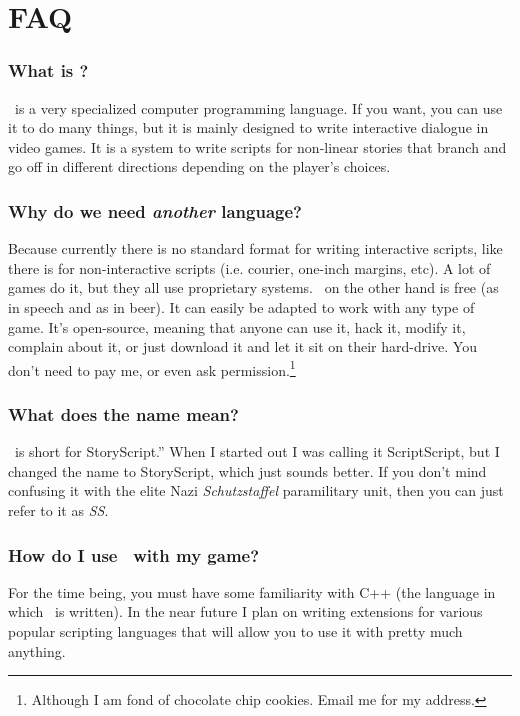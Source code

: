 \appendix

\chapter{FAQ}

\subsection{What is \SSquared?}
\SSquared\ is a very specialized computer programming language.  If you want, you can use it to do many things, but it is mainly designed to write interactive dialogue in video games.  It is a system to write scripts for non-linear stories that branch and go off in different directions depending on the player's choices.

\subsection{Why do we need \emph{another} language?}
Because currently there is no standard format for writing interactive scripts, like there is for non-interactive scripts (i.e. courier, one-inch margins, etc).  A lot of games do it, but they all use proprietary systems.  \SSquared\ on the other hand is free (as in speech and as in beer).  It can easily be adapted to work with any type of game.  It's open-source, meaning that anyone can use it, hack it, modify it, complain about it,  or just download it and let it sit on their hard-drive.  You don't need to pay me, or even ask permission.\footnote{Although I am fond of chocolate chip cookies.  Email me for my address.}

\subsection{What does the name mean?}
\SSquared\ is short for StoryScript.''  When I started out I was calling it ScriptScript, but I changed the name to StoryScript, which just sounds better.   If you don't mind confusing it with the elite Nazi \emph{Schutzstaffel} paramilitary unit, then you can just refer to it as \emph{SS}.

\subsection{How do I use \SSquared\ with my game?}
For the time being, you must have some familiarity with C++ (the language in which \SSquared\ is written).  In the near future I plan on writing extensions for various popular scripting languages that will allow you to use it with pretty much anything.  

